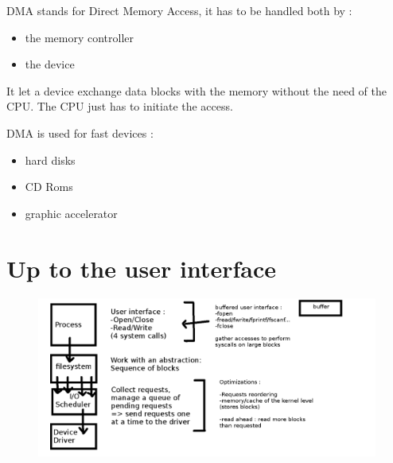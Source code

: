 \documentclass[a4paper,10pt]{article}
\begin{document}
DMA stands for Direct Memory Access, it has to be handled both by :
\begin{itemize}
  \item the memory controller
  \item the device
\end{itemize}

It let a device exchange data blocks with the memory without the need of the CPU.
The CPU just has to initiate the access.


DMA is used for fast devices :
\begin{itemize}
  \item hard disks
  \item CD Roms
  \item graphic accelerator
\end{itemize}

\section{Up to the user interface}

\begin{figure}[h!]
  \begin{center}
    \includegraphics[width=\textwidth]{user_interface.png}
    \label{fig:6}
  \end{center}
\end{figure}
\end{document}
